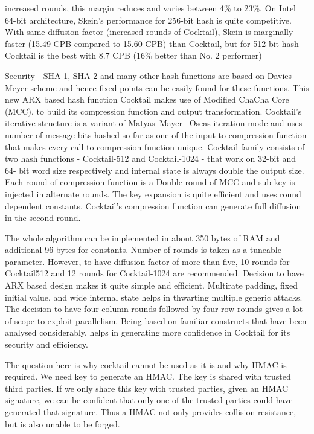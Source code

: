 \documentclass[12pt]{article}
\begin{document}
increased rounds, this margin reduces and varies
between 4\% to 23\%. On Intel 64-bit architecture,
Skein’s performance for 256-bit hash is quite
competitive. With same diffusion factor
(increased rounds of Cocktail), Skein is
marginally faster (15.49 CPB compared to 15.60
CPB) than Cocktail, but for 512-bit hash
Cocktail is the best with 8.7 CPB (16\% better
than No. 2 performer)\par
 Security - SHA-1, SHA-2 and many other
hash functions are based on Davies Meyer
scheme and hence fixed points can be easily
found for these functions. This new ARX based
hash function Cocktail makes use of Modified
ChaCha Core (MCC), to build its compression
function and output transformation. Cocktail’s
iterative structure is a variant of Matyas–Mayer–
Oseas iteration mode and uses number of
message bits hashed so far as one of the input to
compression function that makes every call to
compression function unique. Cocktail family
consists of two hash functions - Cocktail-512 and
Cocktail-1024 - that work on 32-bit and 64- bit
word size respectively and internal state is
always double the output size. Each round of
compression function is a Double round of MCC
and sub-key is injected in alternate rounds. The
key expansion is quite efficient and uses round
dependent constants. Cocktail’s compression
function can generate full diffusion in the second
round. \par The whole algorithm can be implemented
in about 350 bytes of RAM and additional 96
bytes for constants. Number of rounds is taken as
a tuneable parameter. However, to have diffusion
factor of more than five, 10 rounds for Cocktail512 and 12 rounds for Cocktail-1024 are
recommended. Decision to have ARX based
design makes it quite simple and efficient. Multirate padding, fixed initial value, and wide
internal state helps in thwarting multiple generic
attacks. The decision to have four column rounds
followed by four row rounds gives a lot of scope
to exploit parallelism. Being based on familiar
constructs that have been analysed considerably,
helps in generating more confidence in Cocktail
for its security and efficiency.\par
 The question here is why cocktail cannot be
used as it is and why HMAC is required. We
need key to generate an HMAC. The key is
shared with trusted third parties. If we only share
this key with trusted parties, given an HMAC
signature, we can be confident that only one of
the trusted parties could have generated that
signature. Thus a HMAC not only provides
collision resistance, but is also unable to be
forged. 
\end{document}
